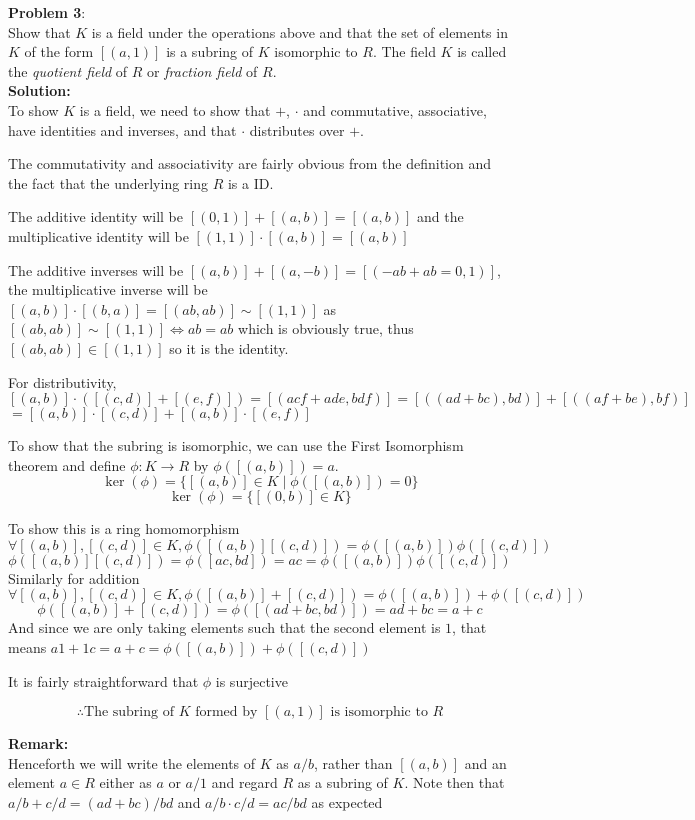 \documentclass[11pt]{article}
\newcommand{\prob}[3]{\begin{flushleft}
        \textbf{Problem #1}: \\
        #2 
		\textbf{Solution:} 
		#3

\end{flushleft}}
\begin{document}
\prob{3}{
Show that $K$ is a field under the operations above and that the set of elements in $K$ of the form $[(a,1)]$ is a subring of $K$ isomorphic to $R$.
The field $K$ is called the \emph{quotient field} of $R$ or \emph{fraction field} of $R$. \\
}{ \\
To show $K$ is a field, we need to show that $+$, $\cdot$ and commutative, associative, have identities and inverses, and that $\cdot$ distributes over $+$.

The commutativity and associativity are fairly obvious from the definition and the fact that the underlying ring $R$ is a ID.

The additive identity will be $[(0,1)] + [(a,b)] = [(a, b)]$ and the multiplicative identity will be $[(1,1)] \cdot [(a,b)] = [(a,b)]$

The additive inverses will be $[(a,b)] + [(a, -b)] = [(-ab + ab = 0,1)]$,
the multiplicative inverse will be $[(a,b)] \cdot [(b,a)] = [(ab, ab)] \sim [(1,1)]$ as $[(ab, ab)] \sim [(1,1)] \iff ab = ab$ which is obviously true, thus $[(ab,ab)] \in [(1,1)]$ so it is the identity.

For distributivity, $[(a,b)] \cdot ([(c,d)] + [(e,f)]) = [(acf + ade, bdf)] = [((ad + bc), bd)] + [((af + be), bf)]$
$= [(a,b)] \cdot [(c,d)] + [(a,b)] \cdot [(e,f)]$

To show that the subring is isomorphic, we can use the First Isomorphism theorem and define $\phi : K \rightarrow R$ by $\phi([(a,b)]) = a$.
$$\ker(\phi) = \{ [(a,b)] \in K \mid \phi([(a,b)]) = 0 \}$$
$$\ker(\phi) = \{ [(0,b)] \in K \}$$

To show this is a ring homomorphism
$$\forall [(a,b)], [(c,d)] \in K, \phi([(a,b)] [(c,d)]) = \phi([(a,b)]) \phi([(c,d)])$$
$$\phi([(a,b)] [(c,d)]) = \phi([ac, bd]) = ac = \phi([(a,b)]) \phi([(c,d)])$$
Similarly for addition
$$\forall [(a,b)], [(c,d)] \in K, \phi([(a,b)] + [(c,d)]) = \phi([(a,b)]) + \phi([(c,d)])$$
$$\phi([(a,b)] + [(c,d)]) = \phi([(ad + bc, bd)]) = ad + bc = a + c$$
And since we are only taking elements such that the second element is $1$, that means $a1 + 1c = a + c = \phi([(a,b)]) + \phi([(c,d)])$

It is fairly straightforward that $\phi$ is surjective

$$\therefore \text{The subring of $K$ formed by $[(a,1)]$ is isomorphic to $R$}$$
}
\textbf{Remark:} \\
Henceforth we will write the elements of $K$ as $a/b$, rather than $[(a,b)]$ and an element $a \in R$ either as $a$ or $a/1$ and regard $R$
as a subring of $K$. Note then that $a/b + c/d = (ad + bc)/bd$ and $a/b \cdot c/d = ac/bd$ as expected
\end{document}
